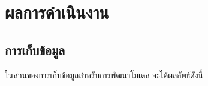 \documentclass[12pt,oneside,openright,a4paper]{cpe-thai-project}
\begin{document}

\chapter{ผลการดำเนินงาน}

  \section{การเก็บข้อมูล}
    \hspace{1cm}ในส่วนของการเก็บข้อมูลสำหรับการพัฒนาโมเดล จะได้ผลลัพธ์ดังนี้
\end{document}
